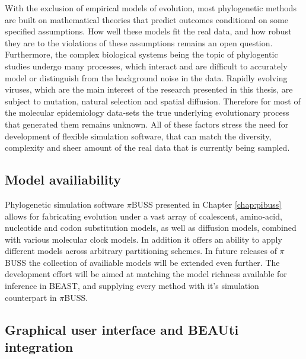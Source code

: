 With the exclusion of empirical models of evolution, most phylogenetic methods are built on mathematical theories that predict outcomes conditional on some specified assumptions.
How well these models fit the real data, and how robust they are to the violations of these assumptions remains an open question.
Furthermore, the complex biological systems being the topic of phylogentic studies undergo many processes, which interact and are difficult to accurately model or distinguish from the background noise in the data.
Rapidly evolving viruses, which are the main interest of the research presented in this thesis, are subject to mutation, natural selection and spatial diffusion.
Therefore for most of the molecular epidemiology data-sets the true underlying evolutionary process that generated them remains unknown.
All of these factors stress the need for development of flexible simulation software, that can match the diversity, complexity and sheer amount of the real data that is currently being sampled.

\subsection{Model availiability}

Phylogenetic simulation software $\pi$BUSS presented in Chapter \ref{chap:pibuss} allows for fabricating evolution under a vast array of coalescent, amino-acid, nucleotide and codon substitution models, as well as diffusion models, combined with various molecular clock models.
In addition it offers an ability to apply different models across arbitrary partitioning schemes.
In future releases of $\pi$BUSS the collection of availiable models will be extended even further.
The development effort will be aimed at matching the model richness available for inference in BEAST, and supplying every method with it's simulation counterpart in $\pi$BUSS.


\subsection{Graphical user interface and BEAUti integration}

